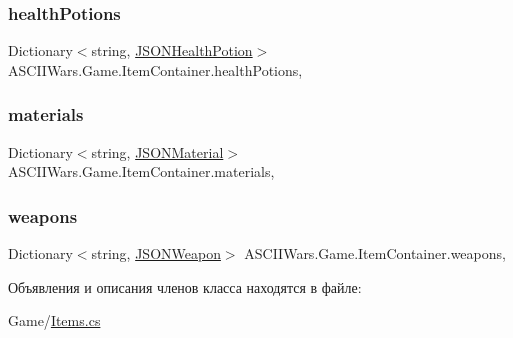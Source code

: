 \subsubsection{\texorpdfstring{health\+Potions}{healthPotions}}
{\footnotesize\ttfamily Dictionary$<$string, \hyperlink{class_a_s_c_i_i_wars_1_1_game_1_1_j_s_o_n_health_potion}{J\+S\+O\+N\+Health\+Potion}$>$ A\+S\+C\+I\+I\+Wars.\+Game.\+Item\+Container.\+health\+Potions\hspace{0.3cm}{\ttfamily [get]}, {\ttfamily [set]}}

\hypertarget{class_a_s_c_i_i_wars_1_1_game_1_1_item_container_a503bd6d21fce823b843969ccf07871bd}{}\label{class_a_s_c_i_i_wars_1_1_game_1_1_item_container_a503bd6d21fce823b843969ccf07871bd} 
\subsubsection{\texorpdfstring{materials}{materials}}
{\footnotesize\ttfamily Dictionary$<$string, \hyperlink{class_a_s_c_i_i_wars_1_1_game_1_1_j_s_o_n_material}{J\+S\+O\+N\+Material}$>$ A\+S\+C\+I\+I\+Wars.\+Game.\+Item\+Container.\+materials\hspace{0.3cm}{\ttfamily [get]}, {\ttfamily [set]}}

\hypertarget{class_a_s_c_i_i_wars_1_1_game_1_1_item_container_aaa8cd3f87c9f17712bca4ea090166ce7}{}\label{class_a_s_c_i_i_wars_1_1_game_1_1_item_container_aaa8cd3f87c9f17712bca4ea090166ce7} 
\subsubsection{\texorpdfstring{weapons}{weapons}}
{\footnotesize\ttfamily Dictionary$<$string, \hyperlink{class_a_s_c_i_i_wars_1_1_game_1_1_j_s_o_n_weapon}{J\+S\+O\+N\+Weapon}$>$ A\+S\+C\+I\+I\+Wars.\+Game.\+Item\+Container.\+weapons\hspace{0.3cm}{\ttfamily [get]}, {\ttfamily [set]}}



Объявления и описания членов класса находятся в файле\+:\begin{DoxyCompactItemize}
\item 
Game/\hyperlink{_items_8cs}{Items.\+cs}\end{DoxyCompactItemize}
